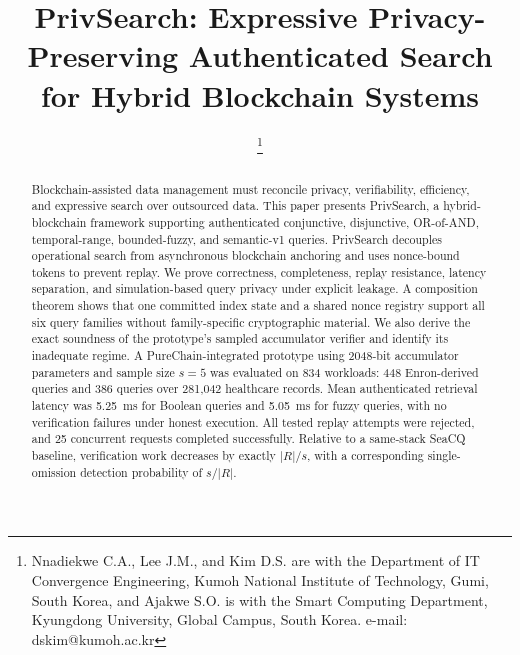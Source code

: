 \documentclass[journal]{IEEEtran}
\theoremstyle{tight}
\theoremstyle{remark}
\theoremstyle{plain}
\begin{document}
 
\title{PrivSearch: Expressive Privacy-Preserving Authenticated Search for Hybrid Blockchain Systems}
\author{
 \thanks{Nnadiekwe C.A., Lee J.M., and Kim D.S. are with the Department of IT Convergence Engineering, Kumoh National Institute of Technology, Gumi, South Korea, and Ajakwe S.O. is with the Smart Computing Department, Kyungdong University, Global Campus, South Korea. e-mail: dskim@kumoh.ac.kr}
}
 
\maketitle
\begin{abstract}
Blockchain-assisted data management must reconcile privacy, verifiability, efficiency, and expressive search over outsourced data. This paper presents PrivSearch, a hybrid-blockchain framework supporting authenticated conjunctive, disjunctive, OR-of-AND, temporal-range, bounded-fuzzy, and semantic-v1 queries. PrivSearch decouples operational search from asynchronous blockchain anchoring and uses nonce-bound tokens to prevent replay. We prove correctness, completeness, replay resistance, latency separation, and simulation-based query privacy under explicit leakage. A composition theorem shows that one committed index state and a shared nonce registry support all six query families without family-specific cryptographic material. We also derive the exact soundness of the prototype's sampled accumulator verifier and identify its inadequate regime. A PureChain-integrated prototype using 2048-bit accumulator parameters and sample size $s=5$ was evaluated on 834 workloads: 448 Enron-derived queries and 386 queries over 281{,}042 healthcare records. Mean authenticated retrieval latency was 5.25~ms for Boolean queries and 5.05~ms for fuzzy queries, with no verification failures under honest execution. All tested replay attempts were rejected, and 25 concurrent requests completed successfully. Relative to a same-stack SeaCQ baseline, verification work decreases by exactly $|R|/s$, with a corresponding single-omission detection probability of $s/|R|$.
\end{abstract}
 
\end{document}
